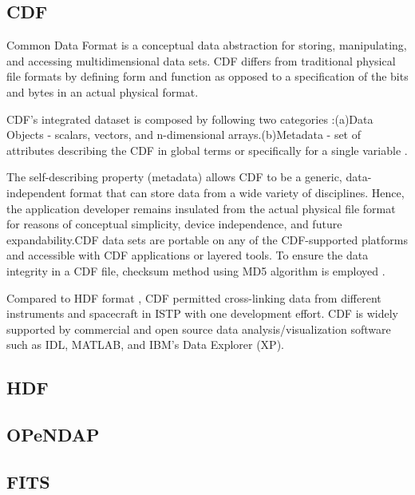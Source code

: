 \subsection{CDF}

     Common Data Format \cite{www-cdf} is a conceptual data
     abstraction for storing, manipulating, and accessing
     multidimensional data sets. CDF differs from traditional physical
     file formats by defining form and function as opposed to a
     specification of the bits and bytes in an actual physical format.
 
     CDF's integrated dataset is composed by following two categories
     :(a)Data Objects - scalars, vectors, and n-dimensional
     arrays.(b)Metadata - set of attributes describing the CDF in
     global terms or specifically for a single variable
     \cite{user-guide-cdf}.

     The self-describing property (metadata) allows CDF to be a
     generic, data-independent format that can store data from a wide
     variety of disciplines. Hence, the application developer remains
     insulated from the actual physical file format for reasons of
     conceptual simplicity, device independence, and future
     expandability.CDF data sets are portable on any of the
     CDF-supported platforms and accessible with CDF applications or
     layered tools. To ensure the data integrity in a CDF file,
     checksum method using MD5 algorithm is employed
     \cite{www-digitalpreserve}.

     Compared to HDF format \cite{www-wiki-hdf}, CDF permitted
     cross-linking data from different instruments and spacecraft in
     ISTP with one development effort. CDF is widely supported by
     commercial and open source data analysis/visualization software
     such as IDL, MATLAB, and IBM’s Data Explorer (XP).

\subsection{HDF}
\subsection{OPeNDAP}
\subsection{FITS}

